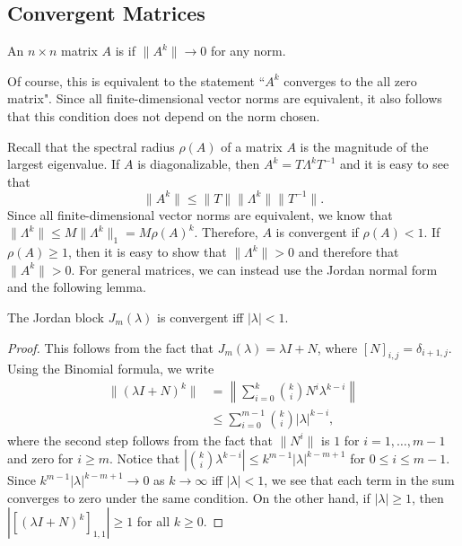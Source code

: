 \subsection{Convergent Matrices}

\begin{definition}
An $n\times n$  matrix $A$ is  if $\| A^k \| \rightarrow 0$ for any norm.
\end{definition}
Of course, this is equivalent to the statement ``$A^k$ converges to the all zero matrix".
Since all finite-dimensional vector norms are equivalent, it also follows that this condition does not depend on the norm chosen.

Recall that the spectral radius $\rho(A)$ of a matrix $A$ is the magnitude of the largest eigenvalue.
If $A$ is diagonalizable, then $A^k = T \Lambda^k T^{-1}$ and it is easy to see that
\[ \| A^k \| \leq \| T \| \| \Lambda^k \| \| T^{-1} \|. \]
Since all finite-dimensional vector norms are equivalent, we know that $ \| \Lambda^k \| \leq M \| \Lambda^k \|_1 = M \rho(A)^k $.
Therefore, $A$ is convergent if $\rho(A)<1$.
If $\rho(A)\geq 1$, then it is easy to show that $\| \Lambda^k \| > 0$ and therefore that $\| A^k \| > 0$.
For general matrices, we can instead use the Jordan normal form and the following lemma.

\begin{lemma}
The Jordan block $J_m (\lambda)$ is convergent iff $| \lambda | <1$.
\end{lemma}
\begin{proof}
This follows from the fact that $J_m (\lambda) = \lambda I + N$, where $[ N ]_{i,j} = \delta_{i+1,j}$.
Using the Binomial formula, we write
\begin{align*}
\| (\lambda I + N)^k \|
& = \left\| \sum_{i=0}^k \binom{k}{i} N^{i} \lambda^{k-i} \right\| \\
& \leq \sum_{i=0}^{m-1} \binom{k}{i} | \lambda |^{k-i},
\end{align*}
where the second step follows from the fact that $\| N^i \|$ is $1$ for $i=1,\ldots,m-1$ and zero for $i\geq m$.
Notice that $| \binom{k}{i} \lambda^{k-i} | \leq k^{m-1} | \lambda |^{k-m+1} $ for $0 \leq i \leq m-1$.
Since $k^{m-1} | \lambda |^{k-m+1} \rightarrow 0$ as $k\rightarrow \infty$ iff $| \lambda | <1$, we see that each term in the sum converges to zero under the same condition.
On the other hand, if $ |\lambda | \geq 1$, then $| \left[ (\lambda I + N)^k \right]_{1,1} | \geq 1$ for all $k\geq 0$.
\end{proof}

